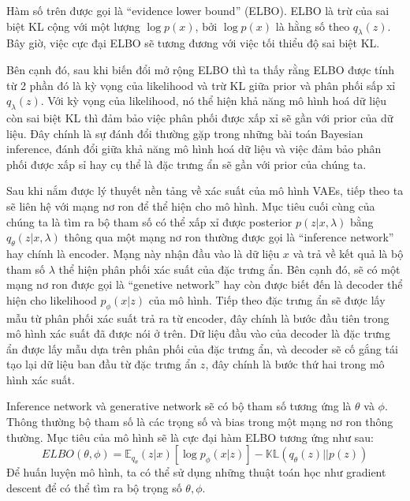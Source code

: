         Hàm số trên được gọi là ``evidence lower bound'' (ELBO).
        ELBO là trừ của sai biệt KL cộng với một lượng $\log p(x)$, bởi $\log p(x)$ là hằng số theo $q_\lambda(z)$.
        Bây giờ, việc cực đại ELBO sẽ tương đương với việc tối thiểu độ sai biệt KL.
        
        Bên cạnh đó, sau khi biến đổi mở rộng ELBO thì ta thấy rằng ELBO được tính từ 2 phần đó là kỳ vọng của likelihood và trừ KL giữa prior và phân phối sấp xỉ $q_\lambda(z)$.
        Với kỳ vọng của likelihood, nó thể hiện khả năng mô hình hoá dữ liệu còn sai biệt KL thì đảm bảo việc phân phối được xấp xỉ sẽ gần với prior của  dữ liệu.
        Đây chính là sự đánh đổi thường gặp trong những bài toán Bayesian inference, đánh đổi giữa khả năng mô hình hoá dữ liệu và việc đảm bảo phân phối được xấp sỉ hay cụ thể là đặc trưng ẩn sẽ gần với prior của chúng ta.

        
        Sau khi nắm được lý thuyết nền tảng về xác suất của mô hình VAEs, tiếp theo ta sẽ liên hệ với mạng nơ ron để thể hiện cho mô hình.
        Mục tiêu cuối cùng của chúng ta là tìm ra bộ tham số có thể xấp xỉ được posterior $ p(z|x,\lambda)$ bằng $q_\theta(z|x,\lambda) $ thông qua một mạng nơ ron thường được gọi là  ``inference network'' hay chính là encoder. Mạng này nhận đầu vào là dữ liệu $x$ và trả về kết quả là bộ tham số $\lambda$ thể hiện phân phối xác suất của đặc trưng ẩn. 
        Bên cạnh đó, sẽ có một mạng nơ ron được gọi là ``genetive network'' hay còn được biết đến là decoder thể hiện cho likelihood $p_{\phi}(x|z)$ của mô hình. 
        Tiếp theo đặc trưng ẩn sẽ được lấy mẫu từ phân phối xác suất trả ra từ encoder, đây chính là bước đầu tiên trong mô hình xác suất đã được nói ở  trên.
        Dữ liệu đầu vào của decoder là đặc trưng ẩn được lấy mẫu dựa trên phân phối của đặc trưng ẩn, và decoder sẽ cố gắng tái tạo lại dữ liệu ban đầu từ đặc trưng ẩn $z$, đây chính là bước thứ hai trong mô hình xác suất.
        
        Inference network và generative network sẽ có bộ tham số tương ứng là $\theta$ và $\phi$.
        Thông thường bộ tham số là các trọng số và bias trong một mạng nơ ron thông thường. 
        Mục tiêu của mô hình sẽ là cực đại hàm ELBO tương ứng như sau:
        $$ELBO(\theta,\phi) = \mathbb{E}_{q_\theta}(z|x)[\log p_\phi(x|z)] - \mathbb{KL}(q_\theta(z)||p(z))$$
        Để huấn luyện mô hình, ta có thể sử dụng những thuật toán học như gradient descent để có thể tìm ra bộ trọng số $\theta,\phi$.
 



  
        
        

       
